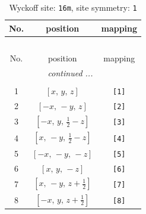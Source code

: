\documentclass[fleqn,8pt]{jsarticle}
\begin{document}
\renewcommand{\arraystretch}{1.2}
\begin{longtable}{ccc}
\caption{Wyckoff site: {\tt 16m}, site symmetry: {\tt 1}}
 \\
 \hline \hline
No. & position & mapping \\ \hline \endfirsthead

\multicolumn{2}{l}{\tablename\ \thetable{}} \\
 \hline \hline
No. & position & mapping \\ \hline \endhead

 \hline \hline
\multicolumn{2}{r}{\footnotesize\it continued ...} \\ \endfoot

 \hline \hline
\multicolumn{2}{r}{} \\ \endlastfoot

1 & $\left[ x,\, y,\, z \right]$ & {\tt [1]} \\ \hline
2 & $\left[ - x,\, - y,\, z \right]$ & {\tt [2]} \\ \hline
3 & $\left[ - x,\, y,\, \frac{1}{2} - z \right]$ & {\tt [3]} \\ \hline
4 & $\left[ x,\, - y,\, \frac{1}{2} - z \right]$ & {\tt [4]} \\ \hline
5 & $\left[ - x,\, - y,\, - z \right]$ & {\tt [5]} \\ \hline
6 & $\left[ x,\, y,\, - z \right]$ & {\tt [6]} \\ \hline
7 & $\left[ x,\, - y,\, z + \frac{1}{2} \right]$ & {\tt [7]} \\ \hline
8 & $\left[ - x,\, y,\, z + \frac{1}{2} \right]$ & {\tt [8]} \\
\end{longtable}
\end{document}
